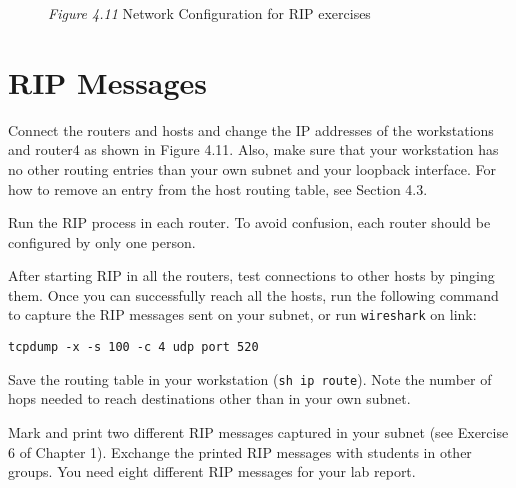 \documentclass{../UTNetLab}
\begin{document}
\begin{figure}[H]
        \caption{\textit{Figure 4.11} Network Configuration for RIP exercises}
    \end{figure}
\section{RIP Messages}
    Connect the routers and hosts and change the IP addresses of the workstations and router4 as shown in Figure 4.11.
    Also, make sure that your workstation has no other routing entries than your own subnet and your loopback interface.
    For how to remove an entry from the host routing table, see Section 4.3.

    Run the RIP process in each router.
    To avoid confusion, each router should be configured by only one person.

    After starting RIP in all the routers, test connections to other hosts by pinging them.
    Once you can successfully reach all the hosts, run the following command to capture the RIP messages sent on your subnet, or run \lstinline{wireshark} on link:
    \begin{lstlisting}
tcpdump -x -s 100 -c 4 udp port 520
    \end{lstlisting}

    Save the routing table in your workstation (\lstinline{sh ip route}).
    Note the number of hops needed to reach destinations other than in your own subnet.

    Mark and print two different RIP messages captured in your subnet (see Exercise 6 of Chapter 1).
    Exchange the printed RIP messages with students in other groups.
    You need eight different RIP messages for your lab report.
    
\end{document}
